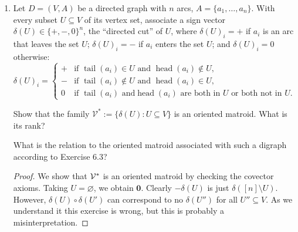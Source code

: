 \documentclass{article}
\begin{document}
\begin{enumerate}
\begin{proof}
\begin{enumerate}[label=(\roman*)]

    Now (V0) is generally not satisfied because we need there to be a common point of intersection of all hyperplanes for $\textbf{0} \in \ca{V}^*$. Then it follows that in general (V1) is not satisfied either.

    \item Consider any arrangement of 2 hyperplanes in $\mathbb{R}^2$. Even if we allow pseudoarrangements, there must be a point of intersection between the two hyperplanes, corresponding to $\textbf{0}$, which there need not be in a configuration. For example, consider the set $\{+-, -+, +0, -0, 0+, 0-\}$.
    
\end{enumerate}
\end{proof}

\item Let $D=(V,A)$ be a directed graph with $n$ arcs, $A=\{a_1,\ldots,a_n\}$. With every subset $U\subseteq V$ of its vertex set, associate a sign vector $\delta(U)\in\{+,-,0\}^n$, the ``directed cut'' of $U$, where $\delta(U)_i=+$ if $a_i$ is an arc that leaves the set $U$; $\delta(U)_i=-$ if $a_i$ enters the set $U$; and $\delta(U)_i=0$ otherwise:
\[
\delta(U)_i=
\begin{cases}
+ & \text{if } \operatorname{tail}(a_i)\in U \text{ and } \operatorname{head}(a_i)\notin U,\\
- & \text{if } \operatorname{tail}(a_i)\notin U \text{ and } \operatorname{head}(a_i)\in U,\\
0 & \text{if } \operatorname{tail}(a_i)\text{ and}\operatorname{head}(a_i)\text{ are both in }U \text{ or both not in }U.
\end{cases}
\]

Show that the family $\mathcal{V}^*:=\{\delta(U):U\subseteq V\}$ is an oriented matroid. What is its rank? 

What is the relation to the oriented matroid associated with such a digraph according to Exercise 6.3?

\begin{proof}
We show that $\mathcal{V}^*$ is an oriented matroid by checking the covector axioms. Taking $U = \varnothing$, we obtain $\textbf{0}$. Clearly $-\delta(U)$ is just $\delta([n]\setminus U)$. However, $\delta(U) \circ \delta(U')$ can correspond to no $\delta(U'')$ for all $U'' \subseteq V$. As we understand it this exercise is wrong, but this is probably a misinterpretation.
\end{proof}


\end{enumerate}
\end{document}
